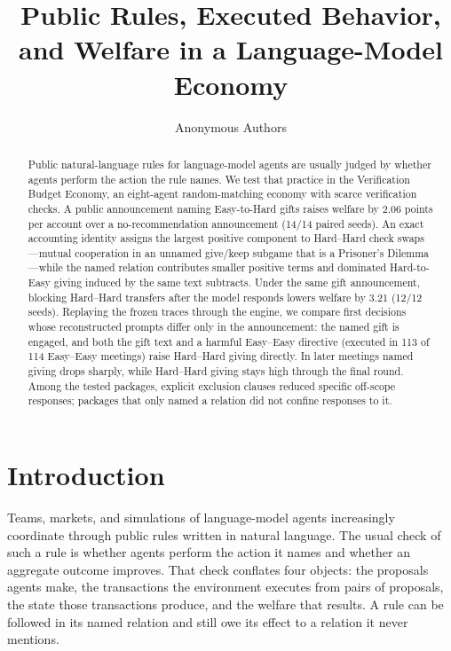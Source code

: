 \documentclass[sigconf,anonymous]{aamas}
\title{Public Rules, Executed Behavior, and Welfare in a Language-Model Economy}
\author{Anonymous Authors}
\affiliation{\institution{Anonymous Institution}}
\begin{document}
\begin{abstract}
Public natural-language rules for language-model agents are usually judged by
whether agents perform the action the rule names.  We test that practice in the
Verification Budget Economy, an eight-agent random-matching economy with scarce
verification checks.  A public announcement naming Easy-to-Hard gifts raises
welfare by 2.06 points per account over a no-recommendation announcement
(14/14 paired seeds).  An exact accounting identity assigns the largest
positive component to Hard--Hard check swaps---mutual cooperation in an unnamed
give\slash keep subgame that is a Prisoner's Dilemma---while the named relation contributes
smaller positive terms and dominated Hard-to-Easy giving induced by the same
text subtracts.  Under the same gift announcement, blocking Hard--Hard transfers
after the model responds lowers welfare by 3.21 (12/12 seeds).  Replaying the
frozen traces through the engine, we compare first decisions whose
reconstructed prompts differ only in the announcement: the named gift is engaged, and both
the gift text and a harmful Easy--Easy directive (executed in 113 of 114
Easy--Easy meetings) raise Hard--Hard giving directly.  In later meetings named
giving drops sharply, while Hard--Hard giving stays high through the final
round.  Among the tested packages, explicit exclusion clauses reduced specific
off-scope responses; packages that only named a relation did not confine
responses to it.
\end{abstract}


\maketitle

\section{Introduction}

Teams, markets, and simulations of language-model agents increasingly
coordinate through public rules written in natural language.  The usual check of such a rule
is whether agents perform the action it names and whether an aggregate outcome
improves.  That check conflates four objects: the proposals agents make, the
transactions the environment executes from pairs of proposals, the state those
transactions produce, and the welfare that results.  A rule can be followed in
its named relation and still owe its effect to a relation it never mentions.
\end{document}
